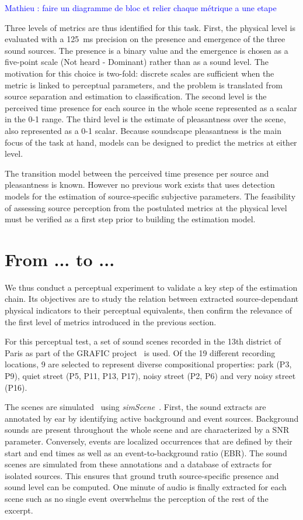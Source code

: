 \documentclass{article}
\newcommand{\ml}[1]{\textcolor{blue}{ Mathieu : #1}}
\begin{document}
\begin{sloppy}
\ml{faire un diagramme de bloc et relier chaque métrique a une etape}

Three levels of metrics are thus identified for this task. First, the physical level is evaluated with a 125~ms precision on the presence and emergence of the three sound sources. The presence is a binary value and the emergence is chosen as a five-point scale (Not heard - Dominant) rather than as a sound level. The motivation for this choice is two-fold: discrete scales are sufficient when the metric is linked to perceptual parameters, and the problem is translated from source separation and estimation to classification. The second level is the perceived time presence for each source in the whole scene represented as a scalar in the 0-1 range. The third level is the estimate of pleasantness over the scene, also represented as a 0-1 scalar. Because soundscape pleasantness is the main focus of the task at hand, models can be designed to predict the metrics at either level. 

The transition model between the perceived time presence per source and pleasantness is known. However no previous work exists that uses detection models for the estimation of source-specific subjective parameters. The feasibility of assessing source perception from the postulated metrics at the physical level must be verified as a first step prior to building the estimation model.

\section{From ... to ...}
\label{sec:val}

We thus conduct a perceptual experiment to validate a key step  of the estimation chain. Its objectives are to study the relation between extracted source-dependant physical indicators to their perceptual equivalents, then confirm the relevance of the first level of metrics introduced in the previous section.

For this perceptual test, a set of sound scenes recorded in the 13th district of Paris as part of the GRAFIC project~\cite{aumond2017} is used. Of the 19 different recording locations, 9 are selected to represent diverse compositional properties: park (P3, P9), quiet street (P5, P11, P13, P17), noisy street (P2, P6) and very noisy street (P16).

The scenes are simulated~\cite{gloaguen2017} using \textit{simScene}~\cite{rossignol2015}. First, the sound extracts are annotated by ear by identifying active background and event sources. Background sounds are present throughout the whole scene and are characterized by a SNR parameter. Conversely, events are localized occurrences that are defined by their start and end times as well as an event-to-background ratio (EBR). The sound scenes are simulated from these annotations and a database of extracts for isolated sources. This ensures that ground truth source-specific presence and sound level can be computed. One minute of audio is finally extracted for each scene such as no single event overwhelms the perception of the rest of the excerpt.


\end{sloppy}
\end{document}
